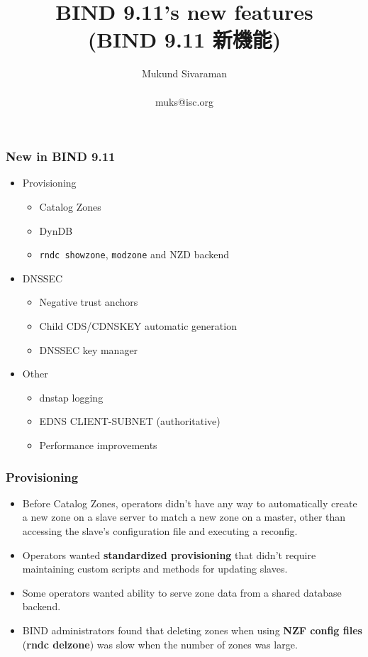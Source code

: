 \documentclass[aspectratio=169,14pt]{beamer}
\title{BIND 9.11's new features\\
(BIND 9.11 新機能)}
\author{Mukund Sivaraman\\
~\\
\small muks@isc.org}
\institute{Internet Systems Consortium}
\date{}
\begin{document}
\frame{\titlepage}

\frame
{
  \frametitle{New in BIND 9.11}

  \begin{itemize}

  \item Provisioning
    \begin{itemize}
    \item Catalog Zones
    \item DynDB
    \item \texttt{rndc showzone}, \texttt{modzone} and NZD backend
    \end{itemize}

  \item DNSSEC
    \begin{itemize}
      \item Negative trust anchors
      \item Child CDS/CDNSKEY automatic generation
      \item DNSSEC key manager
    \end{itemize}

  \item Other
    \begin{itemize}
    \item dnstap logging
    \item EDNS CLIENT-SUBNET (authoritative)
    \item Performance improvements
    \end{itemize}
  \end{itemize}
}

\frame
{
  \frametitle{Provisioning}

  \begin{itemize}

  \item Before Catalog Zones, operators didn't have any way to
    automatically create a new zone on a slave server to match a new
    zone on a master, other than accessing the slave's configuration
    file and executing a reconfig.

  \item Operators wanted \textbf{standardized provisioning} that didn't
    require maintaining custom scripts and methods for updating slaves.

  \item Some operators wanted ability to serve zone data from a shared
    database backend.

  \item BIND administrators found that deleting zones when using
    \textbf{NZF config files} (\textbf{rndc delzone}) was slow when the
    number of zones was large.

  \end{itemize}
}
\end{document}
